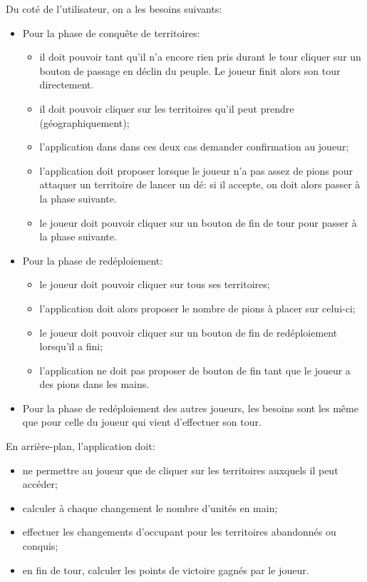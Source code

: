 \documentclass[a4paper, 11pt]{article}
\begin{document}
			Du coté de l'utilisateur, on a les besoins suivants:
			\begin{itemize}
				\item Pour la phase de conquête de territoires:
				\begin{itemize}
					\item il doit pouvoir tant qu'il n'a encore rien pris durant le tour cliquer sur un bouton de passage en déclin du peuple. Le joueur finit alors son tour directement.
					\item il doit pouvoir cliquer sur les territoires qu'il peut prendre (géographiquement);
					\item l'application dans dans ces deux cas demander confirmation au joueur;
					\item l'application doit proposer lorsque le joueur n'a pas assez de pions pour attaquer un territoire de lancer un dé: si il accepte, on doit alors passer à la phase suivante.
					\item le joueur doit pouvoir cliquer sur un bouton de fin de tour pour passer à la phase suivante. \\
				\end{itemize}
				\item Pour la phase de redéploiement:
				\begin{itemize}
					\item le joueur doit pouvoir cliquer sur tous ses territoires;
					\item l'application doit alors proposer le nombre de pions à placer sur celui-ci;
					\item le joueur doit pouvoir cliquer sur un bouton de fin de redéploiement lorsqu'il a fini;
					\item l'application ne doit pas proposer de bouton de fin tant que le joueur a des pions dans les mains.
				\end{itemize}
				\item Pour la phase de redéploiement des autres joueurs, les besoins sont les même que pour celle du joueur qui vient d'effectuer son tour.	 \\	
			\end{itemize}

			En arrière-plan, l'application doit:
			\begin{itemize}
				\item ne permettre au joueur que de cliquer sur les territoires auxquels il peut accéder;
				\item calculer à chaque changement le nombre d'unités en main;
				\item effectuer les changements d'occupant pour les territoires abandonnés ou conquis;
				\item en fin de tour, calculer les points de victoire gagnés par le joueur.
			\end{itemize}
		
\end{document}
